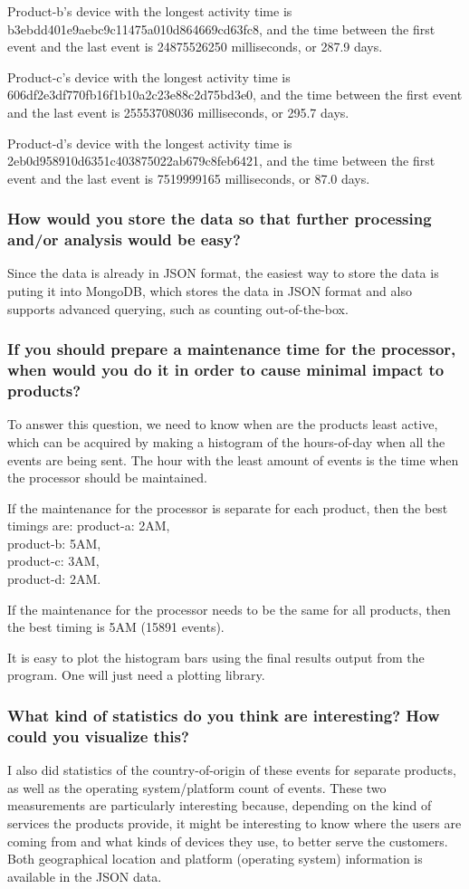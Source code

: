 \documentclass[12pt,letter]{article}
\begin{document}
  Product-b's device with the longest activity time is b3ebdd401e9aebc9c11475a010d864669cd63fc8, and the
  time between the first event and the last event is 24875526250 milliseconds,
  or 287.9 days.

  Product-c's device with the longest activity time is
  606df2e3df770fb16f1b10a2c23e88c2d75bd3e0, and the
  time between the first event and the last event is 25553708036 milliseconds,
  or 295.7 days.

  Product-d's device with the longest activity time is
  2eb0d958910d6351c403875022ab679c8feb6421, and the
  time between the first event and the last event is 7519999165 milliseconds,
  or 87.0 days.

  \subsubsection{How would you store the data so that further processing and/or
  analysis would be easy?}
  Since the data is already in JSON format, the easiest way to store the data is
  puting it into MongoDB, which stores the data in JSON format and also supports
  advanced querying, such as counting out-of-the-box.

  \subsubsection{If you should prepare a maintenance time for the processor,
  when would you do it in order to cause minimal impact to products?}
  To answer this question, we need to know when are the products least active,
  which can be acquired by making a histogram of the hours-of-day when all the events
  are being sent. The hour with the least amount of events is the time when the
  processor should be maintained.

  If the maintenance for the processor is separate for each product, then the
  best timings are:
  product-a: 2AM,\\
  product-b: 5AM,\\
  product-c: 3AM,\\
  product-d: 2AM.

  If the maintenance for the processor needs to be the same for all products,
  then the best timing is 5AM (15891 events).

  It is easy to plot the histogram bars using the final results output from the
  program. One will just need a plotting library.

  \subsubsection{What kind of statistics do you think are interesting? How could
  you visualize this?}
  I also did statistics of the country-of-origin of these events for separate
  products, as well as the operating system/platform count of events. These two
  measurements are particularly interesting because, depending on the kind of
  services the products provide, it might be interesting to know where the
  users are coming from and what kinds of devices they use, to better serve the
  customers. Both geographical location and platform (operating system)
  information is available in the JSON data.
\end{document}
